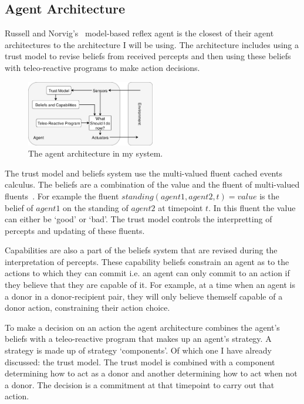 \documentclass[]{final_report}
\begin{document}
\subsection{Agent Architecture}
Russell and Norvig's~\cite{russell2016artificial} model-based reflex agent is the closest of their agent architectures to the architecture I will be using. The architecture includes using a trust model to revise beliefs from received percepts and then using these beliefs with teleo-reactive programs to make action decisions.\par 
\begin{figure}
	\vspace{-30pt}
	\begin{center}
	\includegraphics[width=0.5\textwidth]{AgentArchitecture.png}
	\caption{The agent architecture in my system.}
	\label{fig:model_reflex}
	\end{center}
	\vspace{-30pt}
\end{figure}
The trust model and beliefs system use the multi-valued fluent cached events calculus. The beliefs are a combination of the value and the fluent of multi-valued fluents~\cite{artikis2009specifying}. For example the fluent $standing(agent1, agent2, t)=value$ is the belief of $agent1$ on the standing of $agent2$ at timepoint $t$. In this fluent the value can either be `good' or `bad'. The trust model controls the interpretting of percepts and updating of these fluents.\par
Capabilities are also a part of the beliefs system that are revised during the interpretation of percepts. These capability beliefs constrain an agent as to the actions to which they can commit i.e. an agent can only commit to an action if they believe that they are capable of it. For example, at a time when an agent is a donor in a donor-recipient pair, they will only believe themself capable of a donor action, constraining their action choice.\par 
To make a decision on an action the agent architecture combines the agent's beliefs with a teleo-reactive program that makes up an agent's strategy. A strategy is made up of strategy `components'. Of which one I have already discussed: the trust model. The trust model is combined with a component determining how to act as a donor and another determining how to act when not a donor. The decision is a commitment at that timepoint to carry out that action.
\end{document}
